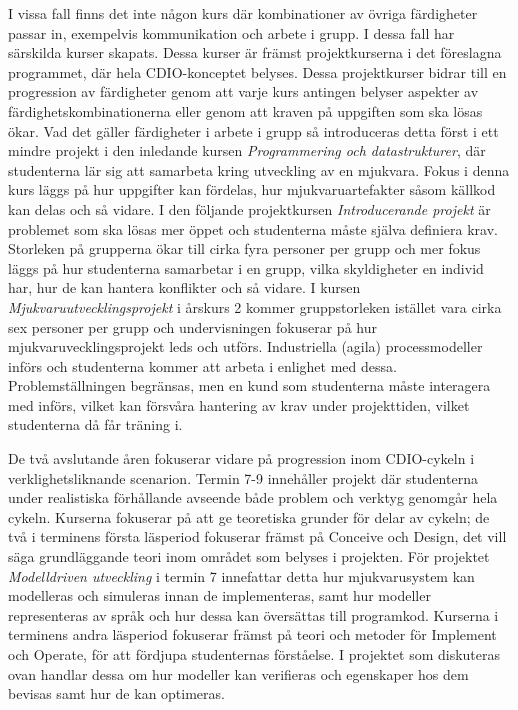 I vissa fall finns det inte någon kurs där kombinationer av övriga färdigheter passar in, exempelvis kommunikation och arbete i grupp. I dessa fall har särskilda kurser skapats. Dessa kurser är främst projektkurserna i det föreslagna programmet, där hela CDIO-konceptet belyses. Dessa projektkurser bidrar till en progression av färdigheter genom att varje kurs antingen belyser aspekter av färdighetskombinationerna eller genom att kraven på uppgiften som ska lösas ökar. Vad det gäller färdigheter i arbete i grupp så introduceras detta först i ett mindre projekt i den inledande kursen \emph{Programmering och datastrukturer}, där studenterna lär sig att samarbeta kring utveckling av en mjukvara. Fokus i denna kurs läggs på hur uppgifter kan fördelas, hur mjukvaruartefakter såsom källkod kan delas och så vidare. I den följande projektkursen \emph{Introducerande projekt} är problemet som ska lösas mer öppet och studenterna måste själva definiera krav. Storleken på grupperna ökar till cirka fyra personer per grupp och mer fokus läggs på hur studenterna samarbetar i en grupp, vilka skyldigheter en individ har, hur de kan hantera konflikter och så vidare. I kursen \emph{Mjukvaruutvecklingsprojekt} i årskurs 2 kommer gruppstorleken istället vara cirka sex personer per grupp och undervisningen fokuserar på hur mjukvaruvecklingsprojekt leds och utförs. Industriella (agila) processmodeller införs och studenterna kommer att arbeta i enlighet med dessa. Problemställningen begränsas, men en kund som studenterna måste interagera med införs, vilket kan försvåra hantering av krav under projekttiden, vilket studenterna då får träning i.

De två avslutande åren fokuserar vidare på progression inom CDIO-cykeln i verklighetsliknande scenarion. Termin 7-9 innehåller projekt där studenterna under realistiska förhållande avseende både problem och verktyg genomgår hela cykeln. Kurserna fokuserar på att ge teoretiska grunder för delar av cykeln; de två i terminens första läsperiod fokuserar främst på Conceive och Design, det vill säga grundläggande teori inom området som belyses i projekten. För projektet \emph{Modelldriven utveckling} i termin 7 innefattar detta hur mjukvarusystem kan modelleras och simuleras innan de implementeras, samt hur modeller representeras av språk och hur dessa kan översättas till programkod. Kurserna i terminens andra läsperiod fokuserar främst på teori och metoder för Implement och Operate, för att fördjupa studenternas förståelse. I projektet som diskuteras ovan handlar dessa om hur modeller kan verifieras och egenskaper hos dem bevisas samt hur de kan optimeras.

